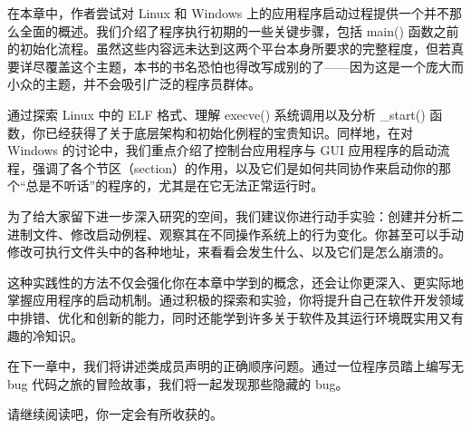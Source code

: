 在本章中，作者尝试对 Linux 和 Windows 上的应用程序启动过程提供一个并不那么全面的概述。我们介绍了程序执行初期的一些关键步骤，包括 main() 函数之前的初始化流程。虽然这些内容远未达到这两个平台本身所要求的完整程度，但若真要详尽覆盖这个主题，本书的书名恐怕也得改写成别的了——因为这是一个庞大而小众的主题，并不会吸引广泛的程序员群体。

通过探索 Linux 中的 ELF 格式、理解 execve() 系统调用以及分析 \_start() 函数，你已经获得了关于底层架构和初始化例程的宝贵知识。同样地，在对 Windows 的讨论中，我们重点介绍了控制台应用程序与 GUI 应用程序的启动流程，强调了各个节区（section）的作用，以及它们是如何共同协作来启动你的那个“总是不听话”的程序的，尤其是在它无法正常运行时。

为了给大家留下进一步深入研究的空间，我们建议你进行动手实验：创建并分析二进制文件、修改启动例程、观察其在不同操作系统上的行为变化。你甚至可以手动修改可执行文件头中的各种地址，来看看会发生什么、以及它们是怎么崩溃的。

这种实践性的方法不仅会强化你在本章中学到的概念，还会让你更深入、更实际地掌握应用程序的启动机制。通过积极的探索和实验，你将提升自己在软件开发领域中排错、优化和创新的能力，同时还能学到许多关于软件及其运行环境既实用又有趣的冷知识。

在下一章中，我们将讲述类成员声明的正确顺序问题。通过一位程序员踏上编写无 bug 代码之旅的冒险故事，我们将一起发现那些隐藏的 bug。

请继续阅读吧，你一定会有所收获的。
